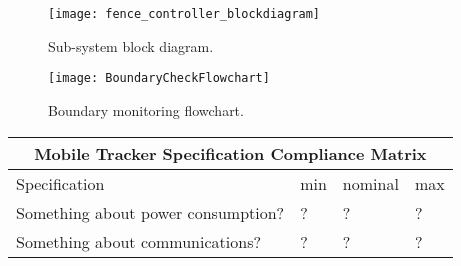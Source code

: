 \documentclass[10pt]{article}
\begin{document}
\begin{figure}[t]
    \texttt{[image: fence\_controller\_blockdiagram]}
    \caption{Sub-system block diagram.}
\end{figure}

\begin{figure}
    \texttt{[image: BoundaryCheckFlowchart]}
    \caption{Boundary monitoring flowchart.}
\end{figure}

\begin{table}[h!]
    \centering
    \begin{tabular}{||p{7cm}|p{1cm}|p{1.5cm}|p{1cm}||}
        \hline
        \multicolumn{4}{|c|}{Mobile Tracker Specification Compliance Matrix}\\
        \hline
        Specification&min&nominal&max\\
        \hline
        Something about power consumption?&?&?&?\\
        Something about communications?&?&?&?\\
        \hline
    \end{tabular}
\end{table}
\end{document}
